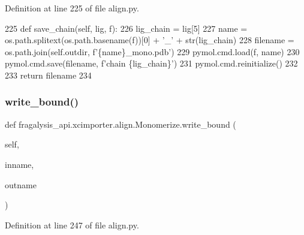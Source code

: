 Definition at line 225 of file align.\+py.


\begin{DoxyCode}
225     \textcolor{keyword}{def }save\_chain(self, lig, f):
226         lig\_chain = lig[5]
227         name = os.path.splitext(os.path.basename(f))[0] + \textcolor{stringliteral}{'\_'} + str(lig\_chain)
228         filename = os.path.join(self.outdir, f\textcolor{stringliteral}{'\{name\}\_mono.pdb'})
229         pymol.cmd.load(f, name)
230         pymol.cmd.save(filename, f\textcolor{stringliteral}{'chain \{lig\_chain\}'})
231         pymol.cmd.reinitialize()
232 
233         \textcolor{keywordflow}{return} filename
234 
\end{DoxyCode}
\mbox{\label{classfragalysis__api_1_1xcimporter_1_1align_1_1_monomerize_aa97d5e71f2d0309e12bc4beafa5151fc}} 
\subsubsection{\texorpdfstring{write\+\_\+bound()}{write\_bound()}}
{\footnotesize\ttfamily def fragalysis\+\_\+api.\+xcimporter.\+align.\+Monomerize.\+write\+\_\+bound (\begin{DoxyParamCaption}\item[{}]{self,  }\item[{}]{inname,  }\item[{}]{outname }\end{DoxyParamCaption})}



Definition at line 247 of file align.\+py.



